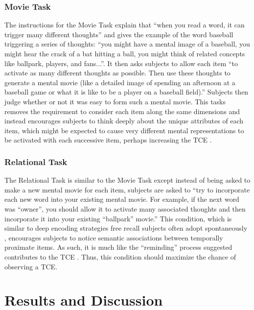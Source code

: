 \documentclass[man,natbib,floatsintext]{apa6} %
\begin{document}
\subsubsection{Movie Task} The instructions for the Movie Task explain that ``when you read a word, it can trigger many different thoughts'' and gives the example of the word baseball triggering a series of thoughts: ``you might have a mental image of a baseball, you might hear the crack of a bat hitting a ball, you might think of related concepts like ballpark, players, and fans...''. It then asks subjects to allow each item ``to activate as many different thoughts as possible. Then use these thoughts to generate a mental movie (like a detailed image of spending an afternoon at a baseball game or what it is like to be a player on a baseball field).'' Subjects then judge whether or not it was easy to form such a mental movie. This tasks removes the requirement to consider each item along the same dimensions and instead encourages subjects to think deeply about the unique attributes of each item, which might be expected to cause very different mental representations to be activated with each successive item, perhaps increasing the TCE \citep[for a different prespective on the influence of item specific processing on the TCE, see][]{McDaEtal11}. 

\subsubsection{Relational Task} The Relational Task is similar to the Movie Task except instead of being asked to make a new mental movie for each item, subjects are asked to ``try to incorporate each new word into your existing mental movie. For example, if the next word was ``owner'', you should allow it to activate many associated thoughts and then incorporate it into your existing ``ballpark'' movie.'' This condition, which is similar to deep encoding strategies free recall subjects often adopt spontaneously \citep{DelaKnow05}, encourages subjects to notice semantic associations between temporally proximate items. As such, it is much like the ``reminding'' process \cite{Hint16} suggested contributes to the TCE \citep[for a similar manipulation see][]{BowClar69}. Thus, this condition should maximize the chance of observing a TCE. 

\section{Results and Discussion}
\end{document}
